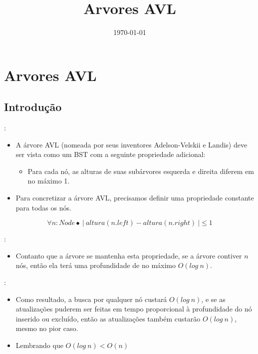 \title{Arvores AVL}
\date{\today}
\frame{\titlepage}


\section{Arvores AVL}
\subsection{Introdução}
\begin{frame}[fragile]{\secname : \subsecname}

  \begin{itemize}
  \item A árvore AVL (nomeada por seus inventores Adelson-Velskii e Landis) deve ser vista como um BST com a seguinte propriedade adicional: 
  \begin{itemize}
  \item Para cada nó, as alturas de suas subárvores esquerda e direita diferem em no máximo 1.
  \end{itemize}
  \item Para concretizar a árvore AVL, precisamos definir uma propriedade constante para todas os nós.
\end{itemize}
\begin{equation}
\forall n: Node \bullet~|~altura(n.left) - altura(n.right)~| \leq 1
\end{equation}

  
\end{frame}

\begin{frame}[fragile]{\secname : \subsecname}

  \begin{itemize}
  \item Contanto que a árvore se mantenha esta propriedade, se a árvore contiver $n$ 
  nós, então ela terá uma profundidade de no máximo $O (log~n)$. 
  \end{itemize}
\end{frame}
\begin{frame}[fragile]{\secname : \subsecname}
  \begin{itemize}

  \item Como resultado, a busca por qualquer nó custará $O (log~n)$, e 
  se as atualizações puderem ser feitas em tempo proporcional à profundidade 
  do nó inserido ou excluído, então as atualizações também 
  custarão $O (log~n)$, mesmo no pior caso.
  \item Lembrando que $O (log~n) < O (n)$ 
  \end{itemize}
\end{frame}
